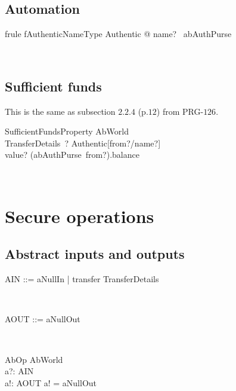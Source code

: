 \subsection*{Automation}

\begin{LFRT}
\begin{theorem}{frule fAuthenticNameType}
  \forall  Authentic @ name? \in  \dom~abAuthPurse
\end{theorem}~\end{LFRT}

\subsection{Sufficient funds}

This is the same as subsection $2.2.4$ (p.$12$) from PRG-$126$.
\begin{LSDef}
\begin{schema}{SufficientFundsProperty}
  AbWorld\\
  TransferDetails~?
\where
  Authentic[from?/name?]\\
  value? \leq  (abAuthPurse~from?).balance
\end{schema}~\end{LSDef}

\section{Secure operations}\label{ch3.secure.op}

\subsection{Abstract inputs and outputs}

\begin{LFType}
\begin{zed}
  AIN ::= aNullIn | transfer \ldata TransferDetails \rdata
\end{zed}~\end{LFType}

\begin{LFType}
\begin{zed}
  AOUT ::= aNullOut
\end{zed}~\end{LFType}

\begin{LSDef}
\begin{schema}{AbOp}
  \Delta AbWorld\\
  a?: AIN\\
  a!: AOUT
\where
  a! = aNullOut
\end{schema}~\end{LSDef}

